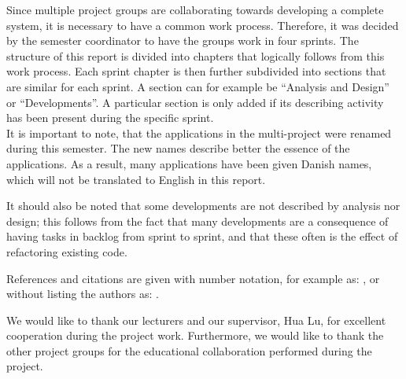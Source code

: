Since multiple project groups are collaborating towards developing a complete system, it is necessary to have a common work process.
Therefore, it was decided by the semester coordinator to have the groups work in four sprints.
The structure of this report is divided into chapters that logically follows from this work process.
Each sprint chapter is then further subdivided into sections that are similar for each sprint.
A section can for example be ``Analysis and Design'' or ``Developments''.
A particular section is only added if its describing activity has been present during the specific sprint.\\

It is important to note, that the applications in the multi-project were renamed during this semester.
The new names describe better the essence of the applications.
As a result, many applications have been given Danish names, which will not be translated to English in this report.

It should also be noted that some developments are not described by analysis nor design; this follows from the fact that many developments are a consequence of having tasks in backlog from sprint to sprint, and that these often is the effect of refactoring existing code.

References and citations are given with number notation, for example as: \citet{launcher2011}, or without listing the authors as: \cite{launcher2011}. 

We would like to thank our lecturers and our supervisor, Hua Lu, for excellent cooperation during the project work.
Furthermore, we would like to thank the other project groups for the educational collaboration performed during the project.
